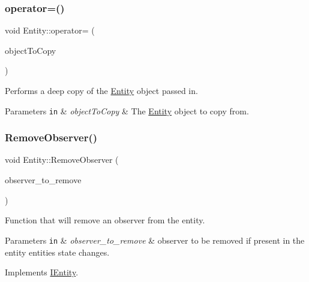 \subsubsection{\texorpdfstring{operator=()}{operator=()}}
{\footnotesize\ttfamily void Entity\+::operator= (\begin{DoxyParamCaption}\item[{const \hyperlink{classEntity}{Entity} \&}]{object\+To\+Copy }\end{DoxyParamCaption})}



Performs a deep copy of the \hyperlink{classEntity}{Entity} object passed in. 


\begin{DoxyParams}[1]{Parameters}
\mbox{\tt in}  & {\em object\+To\+Copy} & The \hyperlink{classEntity}{Entity} object to copy from. \\
\hline
\end{DoxyParams}
\mbox{\label{classEntity_a8e6bb1a529eaa32782d83824861ff29f}} 
\subsubsection{\texorpdfstring{Remove\+Observer()}{RemoveObserver()}}
{\footnotesize\ttfamily void Entity\+::\+Remove\+Observer (\begin{DoxyParamCaption}\item[{\hyperlink{classIObserver}{I\+Observer} $\ast$}]{observer\+\_\+to\+\_\+remove }\end{DoxyParamCaption})\hspace{0.3cm}{\ttfamily [virtual]}}



Function that will remove an observer from the entity. 


\begin{DoxyParams}[1]{Parameters}
\mbox{\tt in}  & {\em observer\+\_\+to\+\_\+remove} & observer to be removed if present in the entity entities state changes. \\
\hline
\end{DoxyParams}


Implements \hyperlink{classIEntity_a651f1ca9f1e494af74e3f580b1c118d6}{I\+Entity}.

\mbox{\label{classEntity_a2cc57041bbb23a4acdf1b2afe1756ac7}} 
